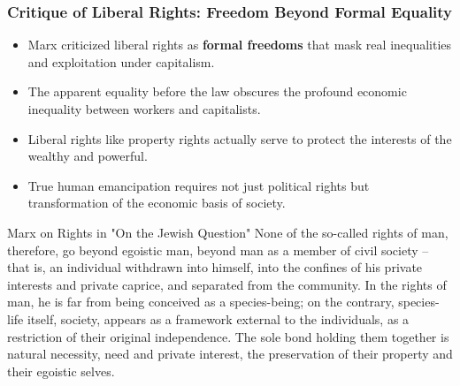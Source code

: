 \documentclass{beamer}
\begin{document}
\begin{frame}
\frametitle{Critique of Liberal Rights: Freedom Beyond Formal Equality}
\begin{itemize}
    \item Marx criticized liberal rights as \textbf{formal freedoms} that mask real inequalities and exploitation under capitalism.
    \item The apparent equality before the law obscures the profound economic inequality between workers and capitalists.
    \item Liberal rights like property rights actually serve to protect the interests of the wealthy and powerful.
    \item True human emancipation requires not just political rights but transformation of the economic basis of society.
\end{itemize}

\begin{exampleblock}{Marx on Rights in "On the Jewish Question"}
    \scriptsize
    None of the so-called rights of man, therefore, go beyond egoistic man, beyond man as a member of civil society – that is, an individual withdrawn into himself, into the confines of his private interests and private caprice, and separated from the community. In the rights of man, he is far from being conceived as a species-being; on the contrary, species-life itself, society, appears as a framework external to the individuals, as a restriction of their original independence. The sole bond holding them together is natural necessity, need and private interest, the preservation of their property and their egoistic selves.
\end{exampleblock}
\end{frame}
\end{document}

